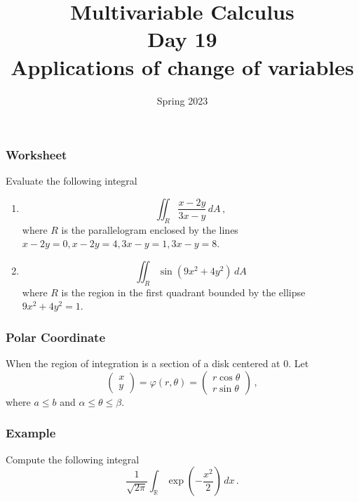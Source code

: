 \documentclass[aspectratio=169]{beamer}
\title{ Multivariable Calculus \\ Day  19 \\ Applications of change of variables }
\date{Spring 2023}
\newcommand{\R}{\mathbb{R}}
\begin{document}
\maketitle


\begin{frame}
    \frametitle{Worksheet}
    Evaluate the following integral
    \begin{enumerate}
        \item 
            \begin{equation*}
                \iint_R \frac{x - 2y}{3x - y} \, dA \,,
            \end{equation*}
            where $R$ is the parallelogram enclosed by the lines
            $x-2y = 0, x- 2y = 4, 3x-y = 1, 3x - y = 8$.

        \item 
            \begin{equation*}
                \iint_R \sin(9x^2 + 4y^2) \, dA
            \end{equation*}
            where $R$ is the region in the first quadrant bounded
            by the ellipse $9x^2 + 4y^2 = 1$.
    \end{enumerate}
\end{frame}

\begin{frame}
    \frametitle{Polar Coordinate}
    When the region of integration is a section of a disk  centered at $0$.
    Let
    \begin{equation*}
        \begin{pmatrix}
            x \\ y
        \end{pmatrix}
        =
        \varphi(r,\theta) = 
        \begin{pmatrix}
            r\cos\theta \\
            r\sin\theta 
        \end{pmatrix} \,,
    \end{equation*}
    where $a \leq b$ and $\alpha \leq \theta \leq \beta$.
\end{frame}

\begin{frame}
    \frametitle{Example}
    Compute the following integral
    \begin{equation*}
        \frac{1}{\sqrt{2\pi}}\int_{\R} \exp\left(-\frac{x^2}{2}\right) \, dx \,.
    \end{equation*}
\end{frame}
\end{document}
